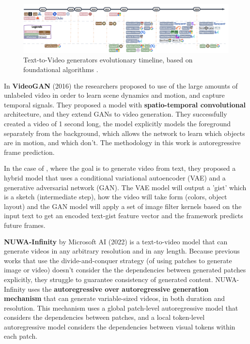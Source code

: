 \begin{figure}
    \centering
    \includegraphics[width=1\textwidth]{images/video_synthesis/timeline.png}
    \caption{Text-to-Video generators evolutionary timeline, based on foundational algorithms \cite{sun2024sora}.}
\end{figure}

In \textbf{VideoGAN} \cite{video_gan} (2016) the researchers proposed to use of the large amounts of unlabeled video in order to learn scene dynamics and motion, and capture temporal signals. They proposed a model with \textbf{spatio-temporal convolutional} architecture, and they extend GANs to video generation. They successfully created a video of 1 second long, the model explicitly models the foreground separately from the background, which allows the network to learn which objects are in motion, and which don't. The methodology in this work is autoregressive frame prediction.

In the case of \cite{video_generation_from_text}, where the goal is to generate video from text, they proposed a hybrid model that uses a conditional variational autoencoder (VAE) and a generative adversarial network (GAN). The VAE model will output a 'gist' which is a sketch (intermediate step), how the video will take form (colors, object layout) and the GAN model will apply a set of image filter kernels based on the input text to get an encoded text-gist feature vector and the framework predicts future frames.

\textbf{NUWA-Infinity} \cite{nuwa_infinity} by Microsoft AI (2022) is a text-to-video model that can generate videos in any arbitrary resolution and in any length. Because previous works that use the divide-and-conquer strategy (of using patches to generate image or video) doesn't consider the the dependencies between generated patches explicitly, they struggle to guarantee consistency of generated content. NUWA-Infinity uses the \textbf{autoregressive over autoregressive generation mechanism} that can generate variable-sized videos, in both duration and resolution. This mechanism uses a global patch-level autoregressive
model that considers the dependencies between patches, and a local token-level autoregressive model considers the dependencies between visual tokens within each patch.

